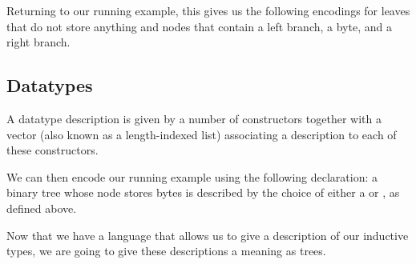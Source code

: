 Returning to our running example, this gives us the following encodings for
leaves that do not store anything
and nodes that contain a left branch, a byte, and a right branch.



\subsection{Datatypes}

A datatype description is given by a number of constructors together with
a vector (also known as a length-indexed list) associating a description
to each of these constructors.


We can then encode our running example using the following 
declaration: a binary tree whose node stores bytes is described by the choice
of either a  or , as defined above.


Now that we have a language that allows us to give a description of our
inductive types, we are going to give these descriptions a meaning as trees.
